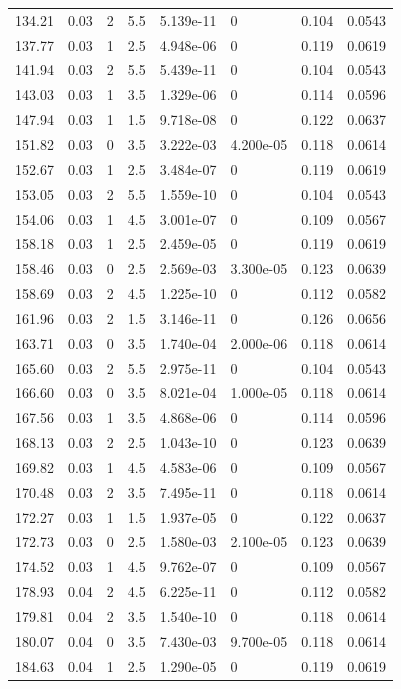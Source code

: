 \documentclass[preview]{standalone}
\begin{document}
{{{\begin{tabular}{L{1.2cm}C{1.2cm} C{0.3cm}C{0.5cm} C{1.4cm}C{1.4cm} C{1.4cm}C{1.4cm}}
  134.21  &  0.03  & 2     & 5.5 &  5.139e-11  & 0  & 0.104 &  0.0543   \\ 
  137.77  &  0.03  & 1     & 2.5 &  4.948e-06  & 0  & 0.119 &  0.0619   \\ 
  141.94  &  0.03  & 2     & 5.5 &  5.439e-11  & 0  & 0.104 &  0.0543   \\ 
  143.03  &  0.03  & 1     & 3.5 &  1.329e-06  & 0  & 0.114 &  0.0596   \\ 
  147.94  &  0.03  & 1     & 1.5 &  9.718e-08  & 0  & 0.122 &  0.0637   \\ 
  151.82  &  0.03  & 0     & 3.5 &  3.222e-03  & 4.200e-05  & 0.118 &  0.0614   \\ 
  152.67  &  0.03  & 1     & 2.5 &  3.484e-07  & 0  & 0.119 &  0.0619   \\ 
  153.05  &  0.03  & 2     & 5.5 &  1.559e-10  & 0  & 0.104 &  0.0543   \\ 
  154.06  &  0.03  & 1     & 4.5 &  3.001e-07  & 0  & 0.109 &  0.0567   \\ 
  158.18  &  0.03  & 1     & 2.5 &  2.459e-05  & 0  & 0.119 &  0.0619   \\ 
  158.46  &  0.03  & 0     & 2.5 &  2.569e-03  & 3.300e-05  & 0.123 &  0.0639   \\ 
  158.69  &  0.03  & 2     & 4.5 &  1.225e-10  & 0  & 0.112 &  0.0582   \\ 
  161.96  &  0.03  & 2     & 1.5 &  3.146e-11  & 0  & 0.126 &  0.0656   \\ 
  163.71  &  0.03  & 0     & 3.5 &  1.740e-04  & 2.000e-06  & 0.118 &  0.0614   \\ 
  165.60  &  0.03  & 2     & 5.5 &  2.975e-11  & 0  & 0.104 &  0.0543   \\ 
  166.60  &  0.03  & 0     & 3.5 &  8.021e-04  & 1.000e-05  & 0.118 &  0.0614   \\ 
  167.56  &  0.03  & 1     & 3.5 &  4.868e-06  & 0  & 0.114 &  0.0596   \\ 
  168.13  &  0.03  & 2     & 2.5 &  1.043e-10  & 0  & 0.123 &  0.0639   \\ 
  169.82  &  0.03  & 1     & 4.5 &  4.583e-06  & 0  & 0.109 &  0.0567   \\ 
  170.48  &  0.03  & 2     & 3.5 &  7.495e-11  & 0  & 0.118 &  0.0614   \\ 
  172.27  &  0.03  & 1     & 1.5 &  1.937e-05  & 0  & 0.122 &  0.0637   \\ 
  172.73  &  0.03  & 0     & 2.5 &  1.580e-03  & 2.100e-05  & 0.123 &  0.0639   \\ 
  174.52  &  0.03  & 1     & 4.5 &  9.762e-07  & 0  & 0.109 &  0.0567   \\ 
  178.93  &  0.04  & 2     & 4.5 &  6.225e-11  & 0  & 0.112 &  0.0582   \\ 
  179.81  &  0.04  & 2     & 3.5 &  1.540e-10  & 0  & 0.118 &  0.0614   \\ 
  180.07  &  0.04  & 0     & 3.5 &  7.430e-03  & 9.700e-05  & 0.118 &  0.0614   \\ 
  184.63  &  0.04  & 1     & 2.5 &  1.290e-05  & 0  & 0.119 &  0.0619   \\ 
\hline 
\end{tabular} 

}}}
\end{document}

